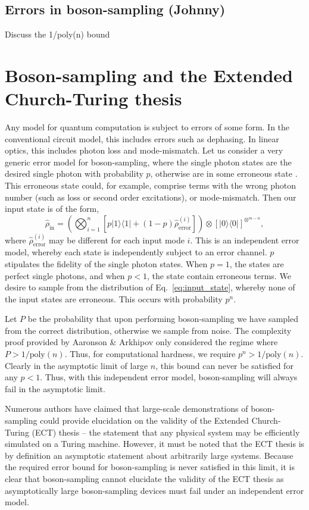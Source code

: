 \documentclass[aps,pra,twocolumn,amsmath,amssymb,nofootinbib,superscriptaddress]{revtex4}
\newcommand{\bra}[1]{\langle#1|}
\newcommand{\ket}[1]{|#1\rangle}
\begin{document}
\subsection{Errors in boson-sampling (Johnny)}
Discuss the 1/poly(n) bound

\section{Boson-sampling and the Extended Church-Turing thesis}

Any model for quantum computation is subject to errors of some form. In the conventional circuit model, this includes errors such as dephasing. In linear optics, this includes photon loss and mode-mismatch. Let us consider a very generic error model for boson-sampling, where the single photon states are the desired single photon with probability $p$, otherwise are in some erroneous state \cite{bib:BSECT}. This erroneous state could, for example, comprise terms with the wrong photon number (such as loss or second order excitations), or mode-mismatch. Then our input state is of the form,
\begin{equation} \label{eq:error_model}
\hat\rho_\mathrm{in} =\left(\bigotimes_{i=1}^n[p\ket{1}\bra{1} + (1-p)\hat\rho_\mathrm{error}^{(i)}]\right) \otimes [\ket{0}\bra{0}]^{\otimes^{m-n}},
\end{equation}
where \mbox{$\hat\rho_\mathrm{error}^{(i)}$} may be different for each input mode $i$. This is an independent error model, whereby each state is independently subject to an error channel. $p$ stipulates the fidelity of the single photon states. When \mbox{$p=1$}, the states are perfect single photons, and when \mbox{$p<1$}, the state contain erroneous terms. We desire to sample from the distribution of Eq.~\ref{eq:input_state}, whereby none of the input states are erroneous. This occurs with probability $p^n$.

Let $P$ be the probability that upon performing boson-sampling we have sampled from the correct distribution, otherwise we sample from noise. The complexity proof provided by Aaronson \& Arkhipov only considered the regime where \mbox{$P>1/\mathrm{poly}(n)$}. Thus, for computational hardness, we require \mbox{$p^n > 1/\mathrm{poly}(n)$}. Clearly in the asymptotic limit of large $n$, this bound can never be satisfied for any $p<1$. Thus, with this independent error model, boson-sampling will always fail in the asymptotic limit.

Numerous authors \cite{bib:Broome20122012, bib:ShenDuan13, bib:AA13response, bib:Shchesnovich13, bib:Molmer13} have claimed that large-scale demonstrations of boson-sampling could provide elucidation on the validity of the Extended Church-Turing (ECT) thesis -- the statement that any physical system may be efficiently simulated on a Turing machine. However, it must be noted that the ECT thesis is by definition an asymptotic statement about arbitrarily large systems. Because the required error bound for boson-sampling is never satisfied in this limit, it is clear that boson-sampling cannot elucidate the validity of the ECT thesis as asymptotically large boson-sampling devices must fail under an independent error model.
\end{document}
